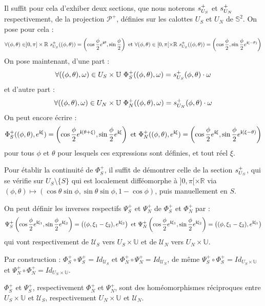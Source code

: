 \par
Il suffit pour cela d'exhiber deux sections, que nous noterons $s_{U_{S}}^{+}$ et $s_{U_{N}}^{+}$ respectivement, %
de la projection $\mathcal{P}^+$, d\'efinies sur les calottes $U_S$ et $U_N$ de $\mathbb{S}^2$. On pose pour cela :
\[\forall (\phi,\theta)\in]0,\pi]\times\mathbb{R}\ \se{S}{+}((\phi,\theta))=\left(\cos\dfrac{\phi}{2}\ec{\theta},\sin\dfrac{\phi}{2}\right)\text{ et }%
\forall (\phi,\theta)\in[0,\pi[\times\mathbb{R}\ \se{S}{+}((\phi,\theta))=\left(\cos\dfrac{\phi}{2},\sin\dfrac{\phi}{2}\ec{(-\theta)}\right)\]
On pose maintenant, d'une part :
\[\forall ((\phi,\theta),\omega)\in U_S\times\mathbb{U}\ \Phi_S^+((\phi,\theta),\omega)=s_{U_{S}}^{+}(\phi,\theta)\cdot\omega\]%
et d'autre part :
\[\forall ((\phi,\theta),\omega)\in U_N\times\mathbb{U}\ \Phi_N^+((\phi,\theta),\omega)=s_{U_{N}}^{+}(\phi,\theta)\cdot\omega\]%
On peut encore \'ecrire :
\[\Phi_S^+((\phi,\theta),\ec{\xi})=\st{\phi}{(\theta+\xi)}{\xi}\text{ et }%
\Phi_N^+((\phi,\theta),\ec{\xi})=\st{\phi}{\xi}{(\xi-\theta)}\]
pour tous $\phi$ et $\theta$ pour lesquels ces expressions sont d\'efinies, et tout r\'eel $\xi$.

\par
Pour \'etablir la continuit\'e de $\Phi_S^+$, il suffit de d\'emontrer celle de la section $s_{U_{S}}^{+}$, %
qui se v\'erifie sur $U_S\setminus\{S\}$ qui est localement diff\'eomorphe \`a $]0,\pi [\times\mathbb{R}$ via %
$(\phi,\theta )\mapsto\left(\cos\theta\sin\phi ,\sin\theta\sin\phi ,1-\cos\phi\right)$, puis \og{}manuellement\fg{} en $S$.

\par
On peut d\'efinir les inverses respectifs $\Psi_S^+$ et $\Psi_N^+$ de $\Phi_S^+$ et $\Phi_N^+$ par :
\[\Psi_S^+\left(\cos\dfrac{\phi}{2}e^{\mathbf{i}\xi_1},\sin\dfrac{\phi}{2}e^{\mathbf{i}\xi_2}\right)=\left((\phi,\xi_1-\xi_2),e^{\mathbf{i}\xi_2}\right)\text{ et }\Psi_N^+\left(\cos\dfrac{\phi}{2}e^{\mathbf{i}\xi_1},\sin\dfrac{\phi}{2}e^{\mathbf{i}\xi_2}\right)=\left((\phi,\xi_1-\xi_2),e^{\mathbf{i}\xi_1}\right)\]
qui vont respectivement de $\mathcal{U}_S$ vers $U_S\times\mathbb{U}$ et de $\mathcal{U}_N$ vers $U_N\times\mathbb{U}$.

\par
Par construction : $\Phi_S^+\circ\Psi_S^+=Id_{\mathcal{U}_S}$ et $\Phi_N^+\circ\Psi_N^+=Id_{\mathcal{U}_N}$, %
de m\^eme $\Psi_S^+\circ\Phi_S^+=Id_{U_S\times\mathbb{U}}$ et $\Psi_N^+\circ\Phi_N^+=Id_{U_N\times\mathbb{U}}$.

\par
$\Phi_S^+$ et $\Psi_S^+$, respectivement $\Phi_N^+$ et $\Psi_N^+$, sont des hom\'eomorphismes r\'eciproques %
entre $U_S\times\mathbb{U}$ et $\mathcal{U}_S$, respectivement $U_N\times\mathbb{U}$ et $\mathcal{U}_N$.

